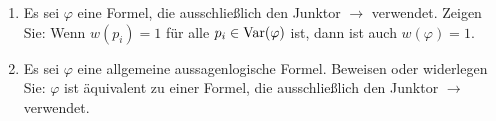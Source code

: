 \begin{exercise}
  \label{logic:junctor-1}
  \begin{enumerate}[label={\alph*)}]
  \item Es sei $\varphi$ eine Formel, die ausschließlich den Junktor
    $\rightarrow$ verwendet. Zeigen Sie: Wenn $w(p_i) = 1$ für alle $p_i \in
    \operatorname{Var}(\varphi)$ ist, dann ist auch $w(\varphi) = 1$.
  \item Es sei $\varphi$ eine allgemeine aussagenlogische Formel.  Beweisen oder
    widerlegen Sie: $\varphi$ ist äquivalent zu einer Formel, die ausschließlich
    den Junktor $\rightarrow$ verwendet.
  \end{enumerate}
\end{exercise}
